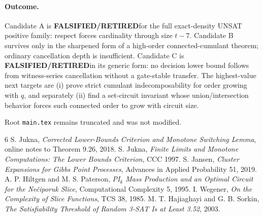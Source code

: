 \documentclass[11pt]{article}
\newcommand{\RET}{\textbf{FALSIFIED/RETIRED}}
\begin{document}
\paragraph{Outcome.}
Candidate A is \RET for the full exact-density UNSAT positive family: respect forces cardinality through size $t-7$. Candidate B survives only in the sharpened form of a high-order connected-cumulant theorem; ordinary cancellation depth is insufficient. Candidate C is \RET in its generic form: no decision lower bound follows from witness-series cancellation without a gate-stable transfer. The highest-value next targets are (i) prove strict cumulant indecomposability for order growing with $q$, and separately (ii) find a set-circuit invariant whose union/intersection behavior forces such connected order to grow with circuit size.

Root \texttt{main.tex} remains truncated and was not modified.

\begin{thebibliography}{6}
 S. Jukna, \emph{Corrected Lower-Bounds Criterion and Monotone Switching Lemma}, online notes to Theorem 9.26, 2018.
 S. Jukna, \emph{Finite Limits and Monotone Computations: The Lower Bounds Criterion}, CCC 1997.
 S. Jansen, \emph{Cluster Expansions for Gibbs Point Processes}, Advances in Applied Probability 51, 2019.
 A. P. Hiltgen and M. S. Paterson, \emph{PI$_k$ Mass Production and an Optimal Circuit for the Ne\v{c}iporuk Slice}, Computational Complexity 5, 1995.
 I. Wegener, \emph{On the Complexity of Slice Functions}, TCS 38, 1985.
 M. T. Hajiaghayi and G. B. Sorkin, \emph{The Satisfiability Threshold of Random 3-SAT Is at Least 3.52}, 2003.
\end{thebibliography}
\end{document}
